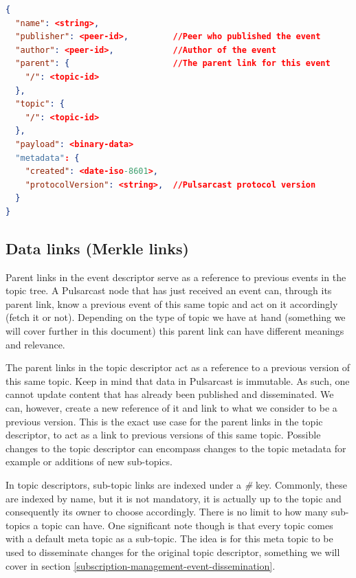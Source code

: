 \begin{lstlisting}[float, language=JSON,caption={Event descriptor schema in a JSON based format},label={event-descriptor}]
{
  "name": <string>,
  "publisher": <peer-id>,         //Peer who published the event
  "author": <peer-id>,            //Author of the event
  "parent": {                     //The parent link for this event
    "/": <topic-id>
  },
  "topic": {
    "/": <topic-id>
  },
  "payload": <binary-data>
  "metadata": {
    "created": <date-iso-8601>,
    "protocolVersion": <string>,  //Pulsarcast protocol version
  }
}
\end{lstlisting}

\subsection{Data links (Merkle links)}\label{subsec:data-links}

Parent links in the event descriptor serve as a reference to previous events in
the topic tree. A Pulsarcast node that has just received an event can, through
its parent link, know a previous event of this same topic and act on it
accordingly (fetch it or not). Depending on the type of topic we have at hand
(something we will cover further in this document) this parent link can have
different meanings and relevance.

The parent links in the topic descriptor act as a reference to a previous
version of this same topic. Keep in mind that data in Pulsarcast is immutable.
As such, one cannot update content that has already been published and
disseminated. We can, however, create a new reference of it and link to what we
consider to be a previous version. This is the exact use case for the parent
links in the topic descriptor, to act as a link to previous versions of this
same topic. Possible changes to the topic descriptor can encompass changes to
the topic metadata for example or additions of new sub-topics.

In topic descriptors, sub-topic links are indexed under a \emph{\#} key.
Commonly, these are indexed by name, but it is not mandatory, it is actually up
to the topic and consequently its owner to choose accordingly.  There is no
limit to how many sub-topics a topic can have. One significant note though is
that every topic comes with a default meta topic as a sub-topic. The idea is
for this meta topic to be used to disseminate changes for the original topic
descriptor, something we will cover in section
\ref{subscription-management-event-dissemination}.

